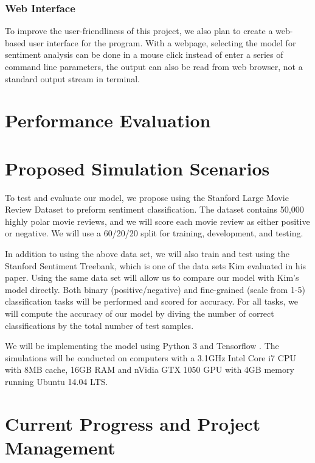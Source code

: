 \documentclass[conference]{IEEEtran}
\begin{document}
\subsubsection{Web Interface}
\label{model:stretch:web}
    To improve the user-friendliness of this project, we also plan to create a 
    web-based user interface for the program. With a webpage, selecting
    the model for sentiment analysis can be done in a mouse click instead of 
    enter a series of command line parameters, the output can also
    be read from web browser, not a standard output stream in terminal. 

\section{Performance Evaluation}
\label{performance}


\section{Proposed Simulation Scenarios}
\label{scenarios}
    To test and evaluate our model, we propose using the Stanford Large Movie Review
    Dataset to preform sentiment classification\cite{maas2011learning}.
    The dataset contains 50,000 highly polar
    movie reviews, and we will score each movie review as either positive or
    negative. We will use a 60/20/20 split for training, development, and testing.

    In addition to using the above data set, we will also train and test using the 
    Stanford Sentiment Treebank, which is one of the data sets Kim evaluated in 
    his paper\cite{sentimenttreebank}. Using the same data set
    will allow us to compare our model with Kim's model directly. 
    Both binary (positive/negative) and fine-grained (scale from 1-5) 
    classification tasks will be performed and scored for accuracy.
    For all tasks, we will compute the accuracy of our model by diving the 
    number of correct classifications by the total number of test samples.

    We will be implementing the model using Python 3 and Tensorflow
    \cite{tensorflow2015-whitepaper}. The 
    simulations will be conducted on computers with a 3.1GHz Intel Core i7 
    CPU with 8MB cache, 16GB RAM and nVidia GTX 1050 GPU with 4GB memory 
    running Ubuntu 14.04 LTS.

\section{Current Progress and Project Management}
\label{manage}
\end{document}
